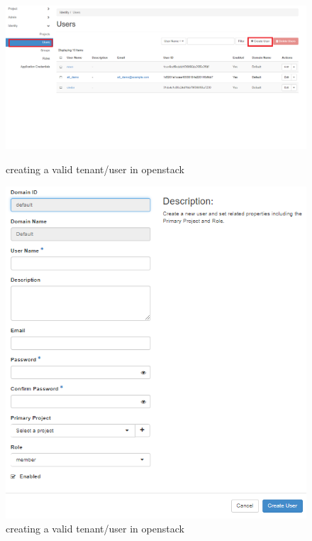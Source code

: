 \begin{itemize}
\begin{figure} [H]
	\centering
	\includegraphics[width=0.5\linewidth]{figures/sh9}
	\caption{creating a valid tenant/user in openstack}
		\includegraphics[width=0.5\linewidth]{figures/sh10}
	\caption{creating a valid tenant/user in openstack}
\end{figure}


\end{itemize}
